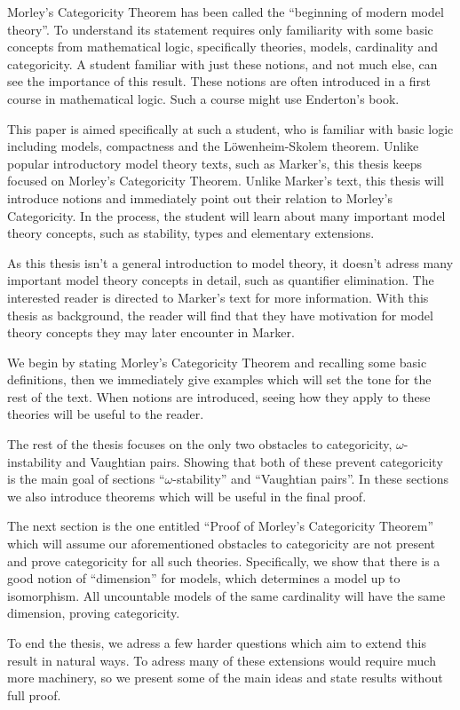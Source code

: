Morley's Categoricity Theorem has been called the ``beginning of modern model theory''.
To understand its statement requires only familiarity with some basic concepts from mathematical logic, specifically theories, models, cardinality and categoricity. 
A student familiar with just these notions, and not much else, can see the importance of this result.
These notions are often introduced in a first course in mathematical logic.
Such a course might use Enderton's book. %

This paper is aimed specifically at such a student, who is familiar with basic logic including models, compactness and the L\"owenheim-Skolem theorem.
Unlike popular introductory model theory texts, such as Marker's, %
this thesis keeps focused on Morley's Categoricity Theorem.
Unlike Marker's text, this thesis will introduce notions and immediately point out their relation to Morley's Categoricity. 
In the process, the student will learn about many important model theory concepts, such as stability, types and elementary extensions. 

As this thesis isn't a general introduction to model theory, it doesn't adress many important model theory concepts in detail, such as quantifier elimination.
The interested reader is directed to Marker's text for more information. 
With this thesis as background, the reader will find that they have motivation for model theory concepts they may later encounter in Marker.

We begin by stating Morley's Categoricity Theorem and recalling some basic definitions, then we immediately give examples which will set the tone for the rest of the text. 
When notions are introduced, seeing how they apply to these theories will be useful to the reader. 

The rest of the thesis focuses on the only two obstacles to categoricity, \(\omega\)-instability and Vaughtian pairs. 
Showing that both of these prevent categoricity is the main goal of sections ``\(\omega\)-stability'' and ``Vaughtian pairs''. 
In these sections we also introduce theorems which will be useful in the final proof. 

The next section is the one entitled ``Proof of Morley's Categoricity Theorem'' which will assume our aforementioned obstacles to categoricity are not present and prove categoricity for all such theories. 
Specifically, we show that there is a good notion of ``dimension'' for models, which determines a model up to isomorphism. 
All uncountable models of the same cardinality will have the same dimension, proving categoricity. 

To end the thesis, we adress a few harder questions which aim to extend this result in natural ways. 
To adress many of these extensions would require much more machinery, so we present some of the main ideas and state results without full proof. 